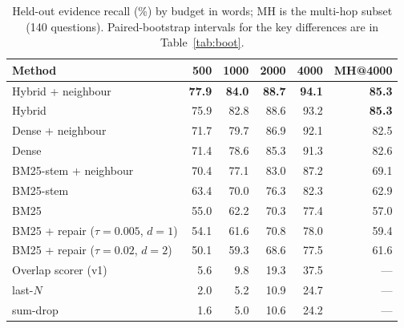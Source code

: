 \documentclass[11pt]{article}
\begin{document}
\begin{table}[t]
  \centering
  \small
  \begin{tabular}{lrrrrr}
    \toprule
    Method & 500 & 1000 & 2000 & 4000 & MH@4000 \\
    \midrule
    Hybrid + neighbour      & \textbf{77.9} & \textbf{84.0} & \textbf{88.7} & \textbf{94.1} & \textbf{85.3} \\
    Hybrid                  & 75.9 & 82.8 & 88.6 & 93.2 & \textbf{85.3} \\
    Dense + neighbour       & 71.7 & 79.7 & 86.9 & 92.1 & 82.5 \\
    Dense                   & 71.4 & 78.6 & 85.3 & 91.3 & 82.6 \\
    BM25-stem + neighbour   & 70.4 & 77.1 & 83.0 & 87.2 & 69.1 \\
    BM25-stem               & 63.4 & 70.0 & 76.3 & 82.3 & 62.9 \\
    BM25                    & 55.0 & 62.2 & 70.3 & 77.4 & 57.0 \\
    BM25 + repair ($\tau{=}0.005$, $d{=}1$) & 54.1 & 61.6 & 70.8 & 78.0 & 59.4 \\
    BM25 + repair ($\tau{=}0.02$, $d{=}2$)  & 50.1 & 59.3 & 68.6 & 77.5 & 61.6 \\
    Overlap scorer (v1)     & 5.6  & 9.8  & 19.3 & 37.5 & --- \\
    last-$N$                & 2.0  & 5.2  & 10.9 & 24.7 & --- \\
    sum-drop                & 1.6  & 5.0  & 10.6 & 24.2 & --- \\
    \bottomrule
  \end{tabular}
  \caption{Held-out evidence recall (\%) by budget in words; MH is the multi-hop subset
  (140 questions). Paired-bootstrap intervals for the key differences are in
  Table~\ref{tab:boot}.}
  \label{tab:main}
\end{table}
\end{document}
